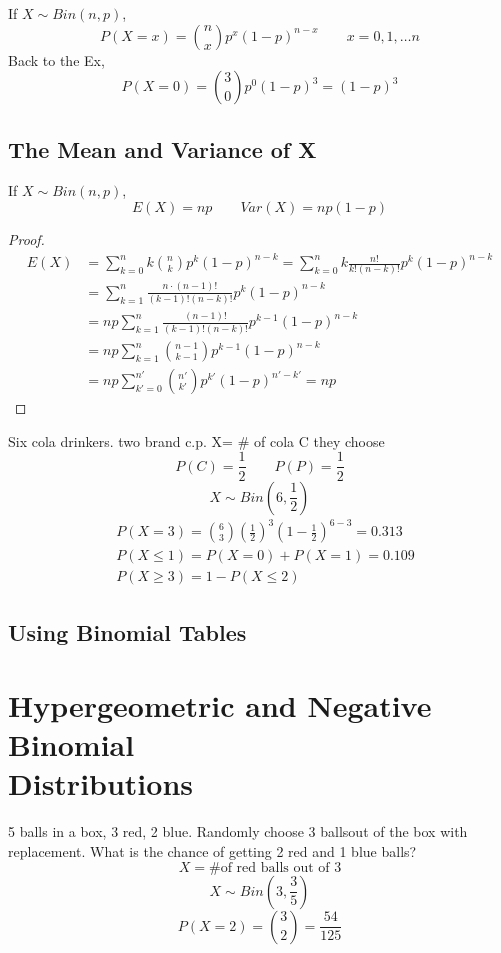 If $X \sim Bin(n,p)$,
\[P(X=x)=\binom nx p^x (1-p)^{n-x}  \qquad x=0,1,\dots n\]
Back to the Ex, \[P(X=0)=\binom 30 p^0 (1-p)^3=(1-p)^3\]

\subsection{The Mean and Variance of X}
\begin{prop}
If $X \sim Bin(n,p)$,
\[E(X)=np \qquad Var(X)=np(1-p)\]
\begin{proof}
\begin{align*}
E(X)&=\sum_{k=0}^{n} k\binom nk p^k (1-p)^{n-k} =\sum_{k=0}^{n} k \frac{n!}{k!(n-k)!} p^k (1-p)^{n-k}\\
&=\sum_{k=1}^{n}  \frac{n \cdot(n-1)!}{(k-1)!(n-k)!} p^k (1-p)^{n-k} \\
&=np \sum_{k=1}^{n}  \frac{(n-1)!}{(k-1)!(n-k)!} p^{k-1} (1-p)^{n-k} \\
&=np \sum_{k=1}^{n}  \binom {n-1}{k-1} p^{k-1} (1-p)^{n-k}		\\
&=np \sum_{k'=0}^{n'}  \binom {n'}{k'} p^{k'} (1-p)^{n'-k'}=np
\end{align*}
\end{proof}
\end{prop}

\begin{exmp}
Six cola drinkers. two brand c.p.
X= \# of cola C they choose
\[P(C)=\frac{1}{2} \qquad P(P)=\frac{1}{2}\]
\[X \sim Bin(6,\frac{1}{2})\]
\begin{align*}
&P(X=3)=\binom 63 \left(\frac{1}{2}\right)^3	\left(1-\frac{1}{2}\right)^{6-3}=0.313 \\
&P(X \leq 1)=P(X=0)+P(X=1)=0.109 \\
&P(X \geq 3)=1-P(X \leq 2)
\end{align*}
\end{exmp}

\subsection{Using Binomial Tables}

\section{Hypergeometric and Negative Binomial\\ Distributions}
\begin{exmp}
5 balls in a box, 3 red, 2 blue. Randomly choose 3 ballsout of the box with replacement. What is the chance of getting 2 red and 1 blue balls?
\[X= \text{\# of red balls out of 3}\]
\[X \sim  Bin\left(3,\frac{3}{5}\right)\]
\[P(X=2)=\binom 32 =\frac{54}{125}\]
\end{exmp}

